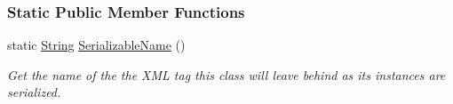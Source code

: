 \subsubsection*{Static Public Member Functions}
\begin{DoxyCompactItemize}
\item 
static \hyperlink{namespacephys_aa03900411993de7fbfec4789bc1d392e}{String} \hyperlink{classphys_1_1Quaternion_afcd13654f4efff1029b47d9f92630d92}{SerializableName} ()
\begin{DoxyCompactList}\small\item\em Get the name of the the XML tag this class will leave behind as its instances are serialized. \item\end{DoxyCompactList}\end{DoxyCompactItemize}
